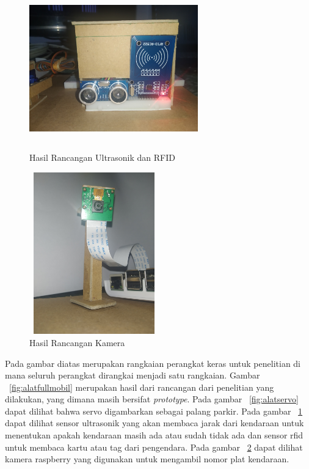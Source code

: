 \begin{figure} [H]
    \includegraphics[height=7cm, width=0.65\textwidth, center]{images/alat-ultra&rfid.jpg}
    \caption{Hasil Rancangan Ultrasonik dan RFID}
    \label{fig:alatultrarfid}
\end{figure}

\begin{figure} [H]
    \includegraphics[height=7cm, width=0.5\textwidth, center]{images/alat-kamera.jpg}
    \caption{Hasil Rancangan Kamera}
    \label{fig:alatkamera}
\end{figure}

Pada gambar diatas merupakan rangkaian perangkat keras untuk penelitian di mana seluruh perangkat dirangkai menjadi satu rangkaian.  Gambar ~\ref{fig:alatfullmobil} merupakan hasil dari rancangan dari penelitian yang dilakukan, yang dimana masih bersifat \textit{prototype}. Pada gambar ~\ref{fig:alatservo} dapat dilihat bahwa servo digambarkan sebagai palang parkir. Pada gambar ~\ref{fig:alatultrarfid} dapat dilihat sensor ultrasonik yang akan membaca jarak dari kendaraan untuk menentukan apakah kendaraan masih ada atau sudah tidak ada dan sensor rfid untuk membaca kartu atau tag dari pengendara. Pada gambar ~\ref{fig:alatkamera} dapat dilihat kamera raspberry yang digunakan untuk mengambil nomor plat kendaraan.

